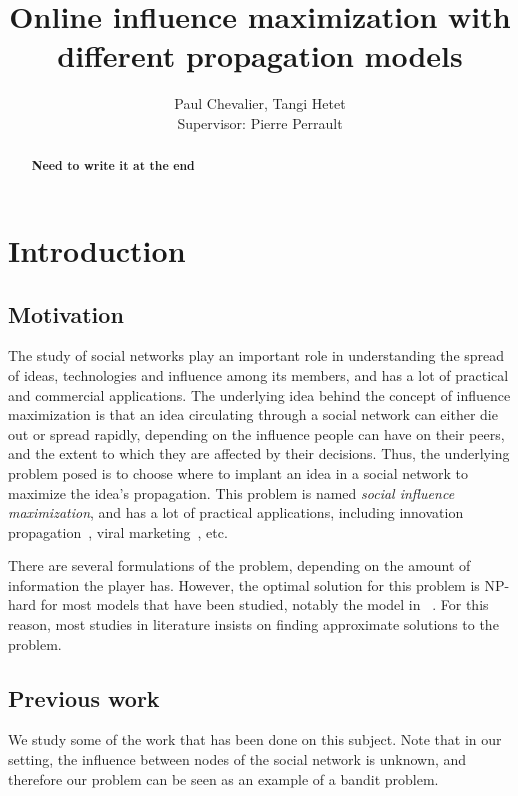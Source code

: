 \documentclass[a4paper,12pt]{article}
\title{Online influence maximization with different propagation models}
\author{Paul Chevalier, Tangi Hetet\\[0.5cm]{Supervisor: Pierre Perrault}}
\begin{document}
\maketitle

\begin{abstract}
\begin{center}
 \textbf{Need to write it at the end }
\end{center}
\end{abstract}

\section{Introduction}
\label{scn:intro}

\subsection{Motivation}

The study of social networks play an important role in understanding the spread of ideas, technologies and influence among its members, and has a lot of practical and commercial applications. The underlying idea behind the concept of influence maximization is that an idea circulating through a social network can either die out or spread rapidly, depending on the influence people can have on their peers, and the extent to which they are affected by their decisions. Thus, the underlying problem posed is to choose where to implant an idea in a social network to maximize the idea's propagation. This problem is named \emph{social influence maximization}, and has a lot of practical applications, including innovation propagation~\cite{coleman1966medical}, viral marketing~\cite{bass1976new}, etc.

There are several formulations of the problem, depending on the amount of information the player has. However, the optimal solution for this problem is NP-hard for most models that have been studied, notably the model in ~\cite{domingos2001mining}. For this reason, most studies in literature insists on finding approximate solutions to the problem.

\subsection{Previous work}

We study some of the work that has been done on this subject. Note that in our setting, the influence between nodes of the social network is unknown, and therefore our problem can be seen as an example of a bandit problem.
\end{document}

